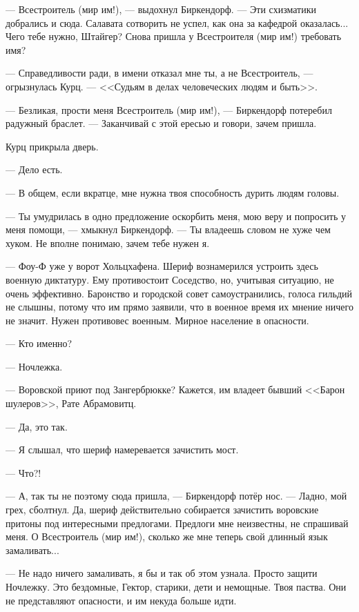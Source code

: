 --- Всестроитель (мир им!), --- выдохнул Биркендорф.
--- Эти схизматики добрались и сюда.
Салавата сотворить не успел, как она за кафедрой оказалась...
Чего тебе нужно, Штайгер?
Снова пришла у Всестроителя (мир им!) требовать имя?

--- Справедливости ради, в имени отказал мне ты, а не Всестроитель, --- огрызнулась Курц.
--- <<Судьям в делах человеческих людям и быть>>.

--- Безликая, прости меня Всестроитель (мир им!), --- Биркендорф потеребил радужный браслет.
--- Заканчивай с этой ересью и говори, зачем пришла.

Курц прикрыла дверь.

--- Дело есть.

\asterism

--- В общем, если вкратце, мне нужна твоя способность дурить людям головы.

--- Ты умудрилась в одно предложение оскорбить меня, мою веру и попросить у меня помощи, --- хмыкнул Биркендорф.
--- Ты владеешь словом не хуже чем хуком.
Не вполне понимаю, зачем тебе нужен я.

--- Фоу-Ф уже у ворот Хольцхафена.
Шериф вознамерился устроить здесь военную диктатуру.
Ему противостоит Соседство, но, учитывая ситуацию, не очень эффективно.
Баронство и городской совет самоустранились, голоса гильдий не слышны, потому что им прямо заявили, что в военное время их мнение ничего не значит.
Нужен противовес военным.
Мирное население в опасности.

--- Кто именно?

--- Ночлежка.

--- Воровской приют под Зангербрюкке?
Кажется, им владеет бывший <<Барон шулеров>>, Рате Абрамовитц.

--- Да, это так.

--- Я слышал, что шериф намеревается зачистить мост.

--- Что?!

--- А, так ты не поэтому сюда пришла, --- Биркендорф потёр нос.
--- Ладно, мой грех, сболтнул.
Да, шериф действительно собирается зачистить воровские притоны под интересными предлогами.
Предлоги мне неизвестны, не спрашивай меня.
О Всестроитель (мир им!), сколько же мне теперь свой длинный язык замаливать...

--- Не надо ничего замаливать, я бы и так об этом узнала.
Просто защити Ночлежку.
Это бездомные, Гектор, старики, дети и немощные.
Твоя паства.
Они не представляют опасности, и им некуда больше идти.

